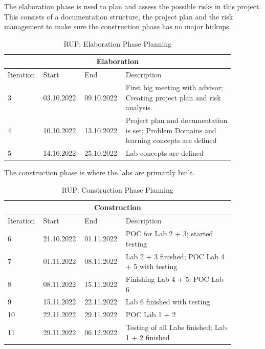 \noindent The elaboration phase is used to plan and assess the possible risks in this project. This consists of a documentation structure, the project plan and the risk management to make sure the construction phase has no major hickups.
\begin{table}[H]
    \centering
    \begin{tabular}{|p{0.12\linewidth}|p{0.15\linewidth}|p{0.15\linewidth}|p{0.46\linewidth}|}
        \hline
        \multicolumn{4}{||c||}{\textbf{Elaboration}} \\
        \hline \hline
        Iteration & Start & End & Description \\
        \hline \hline
        3 & 03.10.2022 & 09.10.2022 & First big meeting with advisor; Creating project plan and risk analysis.\\
        \hline
        4 & 10.10.2022 & 13.10.2022 & Project plan and documentation is set; Problem Domains and learning concepts are defined \\
        \hline
        5 & 14.10.2022 & 25.10.2022 & Lab concepts are defined \\
        \hline
    \end{tabular}
    \caption{RUP: Elaboration Phase Planning}
    \label{elaboration_table}
\end{table}

\noindent The construction phase is where the labs are primarily built. 
\begin{table}[H]
    \centering
    \begin{tabular}{|p{0.12\linewidth}|p{0.15\linewidth}|p{0.15\linewidth}|p{0.46\linewidth}|}
        \hline
        \multicolumn{4}{||c||}{\textbf{Construction}} \\
        \hline \hline
        Iteration & Start & End & Description \\
        \hline \hline
        6 & 21.10.2022 & 01.11.2022 & POC for Lab 2 + 3; started testing \\
        \hline
        7 & 01.11.2022 & 08.11.2022 & Lab 2 + 3 finished; POC Lab 4 + 5 with testing \\
        \hline
        8 & 08.11.2022 & 15.11.2022 & Finishing Lab 4 + 5; POC Lab 6 \\
        \hline
        9 & 15.11.2022 & 22.11.2022 & Lab 6 finished with testing \\
        \hline
        10 & 22.11.2022 & 29.11.2022 & POC Lab 1 + 2 \\
        \hline
        11 & 29.11.2022 & 06.12.2022 & Testing of all Labs finished; Lab 1 + 2 finished \\
        \hline
    \end{tabular}
    \caption{RUP: Construction Phase Planning}
    \label{construction_table}
\end{table}

